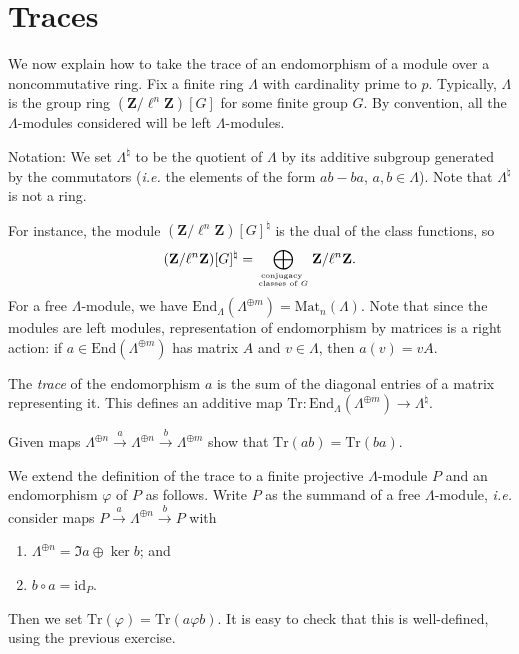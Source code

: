 \section{Traces}

We now explain how to take the trace of an endomorphism of a module over a 
noncommutative ring. Fix a finite ring $\Lambda$ with cardinality prime to $p$. 
Typically, $\Lambda$ is the group ring $(\mathbf{Z}/\ell^n\mathbf{Z})[G]$ for 
some finite group $G$. By convention, all the $\Lambda$-modules considered will 
be left $\Lambda$-modules.

Notation:
We set $\Lambda^\natural$ to be the quotient of $\Lambda$ by its additive 
subgroup generated by the commutators ({\it i.e.} the elements of the form 
$ab-ba$, $a, b \in \Lambda$). Note that $\Lambda^\natural$ is not a ring. 


For instance, the module $(\mathbf{Z}/\ell^n\mathbf{Z})[G]^\natural$ is the 
dual of the class functions, so 
$$
(\mathbf{Z}/\ell^n\mathbf{Z})[G]^\natural = \bigoplus_{\text{conjugacy } \atop 
\text{classes of $G$}} \mathbf{Z}/\ell^n\mathbf{Z}.
$$ 
For a free $\Lambda$-module, we have $\text{End}_\Lambda(\Lambda^{\oplus m}) = 
\text{Mat}_n(\Lambda)$. Note that since the modules are left modules, 
representation of endomorphism by matrices is a right action: if $a \in 
\text{End}(\Lambda^{\oplus m})$ has matrix $A$ and $v \in \Lambda$, then $a(v) 
= v A$.

\begin{definition}
The \emph{trace} of the endomorphism $a$ is the sum of the diagonal entries of 
a matrix representing it. This defines an additive map $\text{Tr} : 
\text{End}_\Lambda(\Lambda^{\oplus m}) \to \Lambda^\natural$.
\end{definition}

\begin{exercise} 
Given maps $\Lambda^{\oplus n} \xrightarrow{a} \Lambda^{\oplus n} 
\xrightarrow{b} \Lambda^{\oplus m}$ show that $\text{Tr}(ab) = \text{Tr}(ba)$. 
\end{exercise}

We extend the definition of the trace to a finite projective $\Lambda$-module 
$P$ and an endomorphism $\varphi$ of $P$ as follows. Write $P$ as the summand 
of a free $\Lambda$-module, {\it i.e.} consider maps $P \xrightarrow{a} 
\Lambda^{\oplus n} \xrightarrow{b} P$ with 
\begin{enumerate}
\item
$\Lambda^{\oplus n} = \Im a \oplus \ker b$; and
\item
$b\circ a = \text{id}_P$.
\end{enumerate}
Then we set $\text{Tr}(\varphi) = \text{Tr}(a\varphi b)$. It is easy to check 
that this is well-defined, using the previous exercise.

